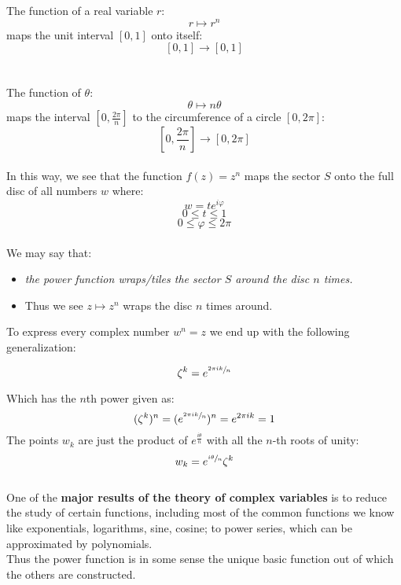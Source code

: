 The function of a real variable $r$:
\[r \mapsto r^n \]
maps the unit interval $[0, 1]$ onto itself:
\[[0, 1] \to [0, 1] \]
\\
\\
The function of $\theta$:
\[\theta \mapsto n\theta \]
maps the interval $[0, \frac{2\pi}{n}]$ to the circumference of a circle $[0, 2\pi]$:
\[ [0, \frac{2\pi}{n}] \to [0, 2\pi] \]
\\
In this way, we see that the function $f(z) = z^n$ maps the sector $S$ onto the full disc of all numbers $w$ where:
\[w = te^{i\varphi} \]
\[0 \leq t \leq 1\]
\[0 \leq \varphi \leq 2\pi \]
\\
We may say that:
\begin{itemize}
	\item \textit{the power function wraps/tiles the sector $S$ around the disc $n$ times.}
	\item Thus we see $z \mapsto z^n$ wraps the disc $n$ times around.
\end{itemize}

To express every complex number $w^n = z$ we end up with the following generalization:
\begin{defn}
	\[\zeta^k = e^{\sfrac{2\pi ik}{n}}\]
\end{defn}
Which has the $n$th power given as:
\[ (\zeta^k)^n = ( e^{\sfrac{2\pi ik}{n}} )^n = e^{2\pi ik} = 1 \]
The points $w_k$ are just the product of $e^{\frac{i\theta}{n}}$ with all the $n$-th roots of unity:
\[w_k = e^{\sfrac{i\theta}{n}}\zeta^k\]
\\
One of the \textbf{major results of the theory of complex variables} is to reduce the study of certain functions, including most of the common functions we know like exponentials, logarithms, sine, cosine; to power series, which can be approximated by polynomials.\\

Thus the power function is in some sense the unique basic function out of which the others are constructed.


